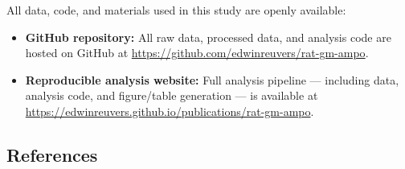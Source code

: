 \documentclass[
  10pt,
  letterpaper,
]{article}
\begin{document}
All data, code, and materials used in this study are openly available:

\begin{itemize}
\item
  \textbf{GitHub repository:} All raw data, processed data, and analysis
  code are hosted on GitHub at
  \url{https://github.com/edwinreuvers/rat-gm-ampo}.
\item
  \textbf{Reproducible analysis website:} Full analysis pipeline ---
  including data, analysis code, and figure/table generation --- is
  available at
  \url{https://edwinreuvers.github.io/publications/rat-gm-ampo}.
\end{itemize}

\newpage{}


\subsection*{References}\label{references}

\renewcommand{\bibsection}{}


\newpage{}


\nolinenumbers
\end{document}
